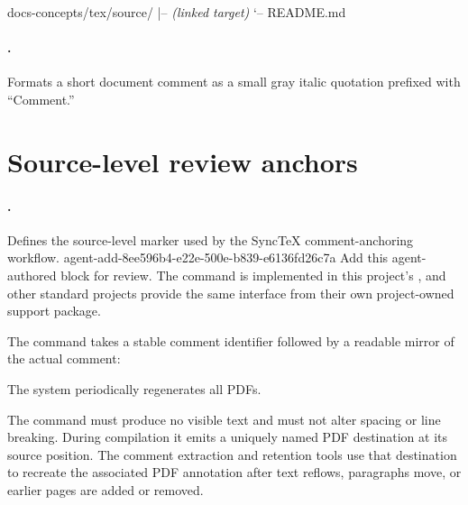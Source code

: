 \begin{LinkedDocCode}
docs-concepts/tex/source/
|--   \textit{(linked target)}
`-- README.md
\end{LinkedDocCode}

\paragraph{.}
Formats a short document comment as a small gray italic quotation prefixed with ``Comment.''

\section*{Source-level review anchors}
\label{sec:manual-style-review-anchor}

\paragraph{\code{\ReviewAnchor}.}
Defines the source-level marker used by the SyncTeX comment-anchoring workflow.
\agentProposedEdit
  {agent-add-8ee596b4-e22e-500e-b839-e6136fd26c7a}
  {Add this agent-authored block for review.}
  {}
  {The command is implemented in this project's , and other standard projects provide the same interface from their own project-owned support package.}

The command takes a stable comment identifier followed by a readable mirror of
the actual comment:
\begin{DocCode}
%
The system periodically regenerates all PDFs.
\end{DocCode}

The command must produce no visible text and must not alter spacing or line breaking.
During compilation it emits a uniquely named PDF destination at its source position.
The comment extraction and retention tools use that destination to recreate the associated PDF annotation after text reflows, paragraphs move, or earlier pages are added or removed.

